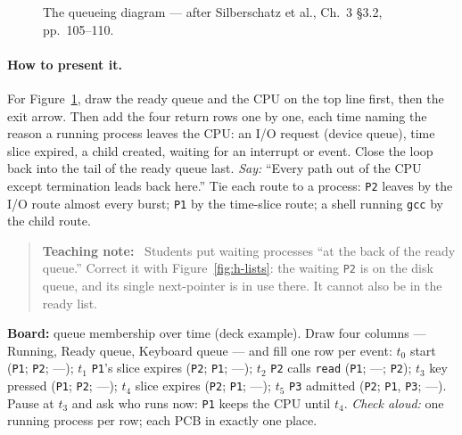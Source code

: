 \documentclass[11pt]{article}
\newenvironment{teachingaside}{\begin{quote}\small\color{primary-gold}\textbf{Teaching note:}\ }{\end{quote}}
\begin{document}
\begin{figure}[h]
\centering
{}
\caption{The queueing diagram --- after Silberschatz et al., Ch.~3 \S3.2, pp.~105--110.}
\label{fig:h-queue}
\end{figure}

\paragraph{How to present it.} For Figure~\ref{fig:h-queue}, draw the ready queue and the CPU on the top line first, then the exit arrow. Then add the four return rows one by one, each time naming the reason a running process leaves the CPU: an I/O request (device queue), time slice expired, a child created, waiting for an interrupt or event. Close the loop back into the tail of the ready queue last. \emph{Say:} ``Every path out of the CPU except termination leads back here.'' Tie each route to a process: \texttt{P2} leaves by the I/O route almost every burst; \texttt{P1} by the time-slice route; a shell running \texttt{gcc} by the child route.

\begin{teachingaside}
Students put waiting processes ``at the back of the ready queue.'' Correct it with Figure~\ref{fig:h-lists}: the waiting \texttt{P2} is on the disk queue, and its single next-pointer is in use there. It cannot also be in the ready list.
\end{teachingaside}

\textbf{Board:} queue membership over time (deck example). Draw four columns --- Running, Ready queue, Keyboard queue --- and fill one row per event: $t_0$ start (\texttt{P1}; \texttt{P2}; ---); $t_1$ \texttt{P1}'s slice expires (\texttt{P2}; \texttt{P1}; ---); $t_2$ \texttt{P2} calls \texttt{read} (\texttt{P1}; ---; \texttt{P2}); $t_3$ key pressed (\texttt{P1}; \texttt{P2}; ---); $t_4$ slice expires (\texttt{P2}; \texttt{P1}; ---); $t_5$ \texttt{P3} admitted (\texttt{P2}; \texttt{P1}, \texttt{P3}; ---). Pause at $t_3$ and ask who runs now: \texttt{P1} keeps the CPU until $t_4$. \emph{Check aloud:} one running process per row; each PCB in exactly one place.
\end{document}
